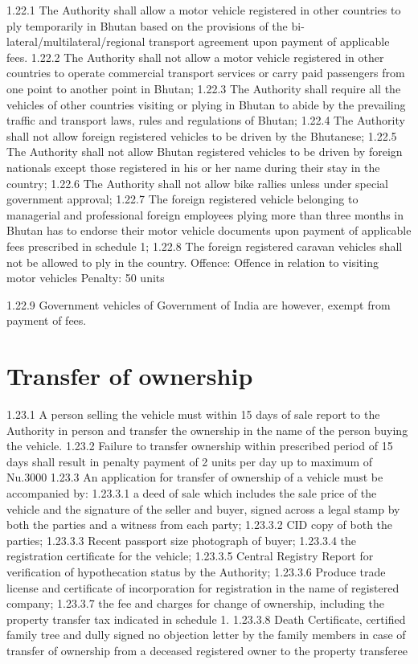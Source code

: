 \documentclass[
]{book}
\begin{document}
1.22.1 The Authority shall allow a motor vehicle registered in other countries to ply temporarily in Bhutan based on the provisions of the bi-lateral/multilateral/regional transport agreement upon payment of applicable fees.
1.22.2 The Authority shall not allow a motor vehicle registered in other countries to operate commercial transport services or carry paid passengers from one point to another point in Bhutan;
1.22.3 The Authority shall require all the vehicles of other countries visiting or plying in Bhutan to abide by the prevailing traffic and transport laws, rules and regulations of Bhutan;
1.22.4 The Authority shall not allow foreign registered vehicles to be driven by the Bhutanese;
1.22.5 The Authority shall not allow Bhutan registered vehicles to be driven by foreign nationals except those registered in his or her name during their stay in the country;
1.22.6 The Authority shall not allow bike rallies unless under special government approval;
1.22.7 The foreign registered vehicle belonging to managerial and professional foreign employees plying more than three months in Bhutan has to endorse their motor vehicle documents upon payment of applicable fees prescribed in schedule 1;
1.22.8 The foreign registered caravan vehicles shall not be allowed to ply in the country.
Offence: Offence in relation to visiting motor vehicles
Penalty: 50 units

1.22.9 Government vehicles of Government of India are however, exempt from payment of fees.

\hypertarget{transfer-of-ownership}{%
\section{Transfer of ownership}\label{transfer-of-ownership}}

1.23.1 A person selling the vehicle must within 15 days of sale report to the Authority in person and transfer the ownership in the name of the person buying the vehicle.
1.23.2 Failure to transfer ownership within prescribed period of 15 days shall result in penalty payment of 2 units per day up to maximum of Nu.3000
1.23.3 An application for transfer of ownership of a vehicle must be accompanied by:
1.23.3.1 a deed of sale which includes the sale price of the vehicle and the signature of the seller and buyer, signed across a legal stamp by both the parties and a witness from each party;
1.23.3.2 CID copy of both the parties;
1.23.3.3 Recent passport size photograph of buyer;
1.23.3.4 the registration certificate for the vehicle;
1.23.3.5 Central Registry Report for verification of hypothecation status by the Authority;
1.23.3.6 Produce trade license and certificate of incorporation for registration in the name of registered company;
1.23.3.7 the fee and charges for change of ownership, including the property transfer tax indicated in schedule 1.
1.23.3.8 Death Certificate, certified family tree and dully signed no objection letter by the family members in case of transfer of ownership from a deceased registered owner to the property transferee
\end{document}
